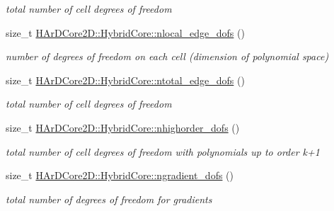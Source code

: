 \begin{DoxyCompactItemize}
\begin{DoxyCompactList}\small\item\em total number of cell degrees of freedom \end{DoxyCompactList}\item 
\mbox{\label{group__HybridCore2D_ga6a45e5ff09d21b18874e1446cd9de9bc}} 
size\+\_\+t \hyperlink{group__HybridCore2D_ga6a45e5ff09d21b18874e1446cd9de9bc}{H\+Ar\+D\+Core2\+D\+::\+Hybrid\+Core\+::nlocal\+\_\+edge\+\_\+dofs} ()
\begin{DoxyCompactList}\small\item\em number of degrees of freedom on each cell (dimension of polynomial space) \end{DoxyCompactList}\item 
\mbox{\label{group__HybridCore2D_ga49a703b6786215e5acf8bb59ecdbc9ea}} 
size\+\_\+t \hyperlink{group__HybridCore2D_ga49a703b6786215e5acf8bb59ecdbc9ea}{H\+Ar\+D\+Core2\+D\+::\+Hybrid\+Core\+::ntotal\+\_\+edge\+\_\+dofs} ()
\begin{DoxyCompactList}\small\item\em total number of cell degrees of freedom \end{DoxyCompactList}\item 
\mbox{\label{group__HybridCore2D_gaa7f78bc066429a18ad596d45a79d37bc}} 
size\+\_\+t \hyperlink{group__HybridCore2D_gaa7f78bc066429a18ad596d45a79d37bc}{H\+Ar\+D\+Core2\+D\+::\+Hybrid\+Core\+::nhighorder\+\_\+dofs} ()
\begin{DoxyCompactList}\small\item\em total number of cell degrees of freedom with polynomials up to order k+1 \end{DoxyCompactList}\item 
\mbox{\label{group__HybridCore2D_ga6f7c5ef5103bed8a3e0ecc18d592b1f9}} 
size\+\_\+t \hyperlink{group__HybridCore2D_ga6f7c5ef5103bed8a3e0ecc18d592b1f9}{H\+Ar\+D\+Core2\+D\+::\+Hybrid\+Core\+::ngradient\+\_\+dofs} ()
\begin{DoxyCompactList}\small\item\em total number of degrees of freedom for gradients \end{DoxyCompactList}\item 
\mbox{\label{group__HybridCore2D_gae6e771ab58f248db8f051d47de982cf5}} 

\end{DoxyCompactItemize}
